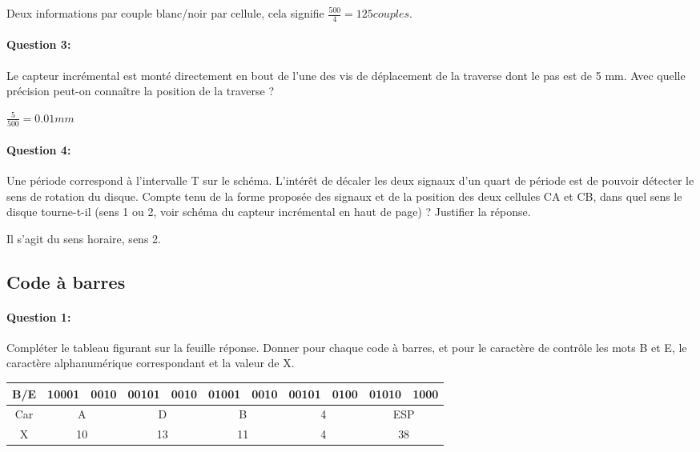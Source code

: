 Deux informations par couple blanc/noir par cellule, cela signifie $\frac{500}{4}=125 couples$.

\paragraph{Question 3:} Le capteur incrémental est monté directement en bout de l'une des vis de déplacement de la traverse dont le pas est de 5 mm. Avec quelle précision peut-on connaître la position de la traverse ?

$\frac{5}{500}=0.01mm$

\paragraph{Question 4:} Une période correspond à l'intervalle T sur le schéma. L'intérêt de décaler les deux signaux d'un quart de période est de pouvoir détecter le sens de rotation du disque. Compte tenu de la forme proposée des signaux et de la position des deux cellules CA et CB, dans quel sens le disque tourne-t-il (sens 1 ou 2, voir schéma du capteur incrémental en haut de page) ? Justifier la réponse. 

Il s'agit du sens horaire, sens 2.

\subsection{Code à barres}

\paragraph{Question 1:} Compléter le tableau figurant sur la feuille réponse. Donner pour chaque code à barres, et pour le caractère de contrôle les mots B et E, le caractère alphanumérique correspondant et la valeur de X. 

\begin{center}
\begin{tabular}{|c|c|c|c|c|c|c|c|c|c|c|}
\hline
B/E & 10001 & 0010 & 00101 & 0010 & 01001 & 0010 & 00101 & 0100 & 01010 & 1000 \\
\hline
Car & \multicolumn{2}{c|}{A} & \multicolumn{2}{c|}{D} & \multicolumn{2}{c|}{B} & \multicolumn{2}{c|}{4} & \multicolumn{2}{c|}{ESP} \\
\hline
X & \multicolumn{2}{c|}{10} & \multicolumn{2}{c|}{13} & \multicolumn{2}{c|}{11} & \multicolumn{2}{c|}{4} & \multicolumn{2}{c|}{38} \\
\hline
\end{tabular}
\end{center}

